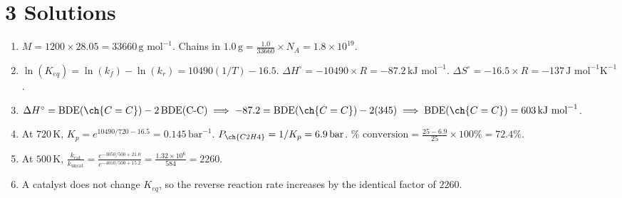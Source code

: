 \documentclass[11pt]{article}
\begin{document}
\section{3 Solutions}
\begin{enumerate}[label=\alph*.]
    \item $M = 1200 \times 28.05 = 33660\,\text{g mol}^{-1}$. Chains in $1.0\,\text{g} = \frac{1.0}{33660} \times N_A = 1.8\times10^{19}$.
    \item $\ln(K_{eq}) = \ln(k_f) - \ln(k_r) = 10490(1/T) - 16.5$.
    $\Delta H^{\circ} = -10490 \times R = -87.2\,\text{kJ mol}^{-1}$. $\Delta S^{\circ} = -16.5 \times R = -137\,\text{J mol}^{-1}\text{K}^{-1}$.
    \item $\Delta H^{\circ} = \text{BDE}(\ch{C=C}) - 2\,\text{BDE}(\text{C-C}) \implies -87.2 = \text{BDE}(\ch{C=C}) - 2(345) \implies \text{BDE}(\ch{C=C}) = 603\,\text{kJ mol}^{-1}$.
    \item At $720\,\text{K}$, $K_p = e^{10490/720 - 16.5} = 0.145\,\text{bar}^{-1}$. $P_{\ch{C2H4}} = 1/K_p = 6.9\,\text{bar}$.
    $\% \text{ conversion} = \frac{25 - 6.9}{25} \times 100\% = 72.4\%$.
    \item At $500\,\text{K}$, $\frac{k_{\text{cat}}}{k_{\text{uncat}}} = \frac{e^{-3050/500 + 21.0}}{e^{-4010/500 + 15.2}} = \frac{1.32\times10^6}{584} = 2260$.
    \item A catalyst does not change $K_{eq}$, so the reverse reaction rate increases by the identical factor of $2260$.
\end{enumerate}
\end{document}
